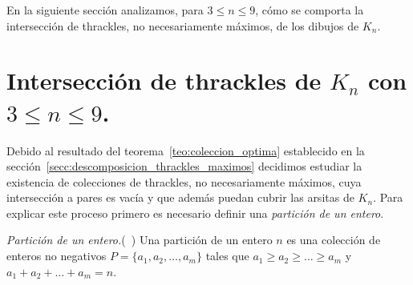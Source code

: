   En la siguiente sección analizamos, para $ 3\leq n\leq 9$, cómo
  se comporta la intersección de thrackles, no necesariamente máximos, de los
  dibujos de $K_n$.


  \section{Intersección de thrackles de $K_n$ con $3\leq n \leq 9$.}\label{secc:interseccion_thrackles}

    Debido al resultado del teorema~\ref{teo:coleccion_optima} establecido
    en la sección~\ref{secc:descomposicion_thrackles_maximos} decidimos estudiar
    la existencia de colecciones de thrackles, no necesariamente máximos,
    cuya intersección a pares es vacía y que además puedan cubrir las arsitas
    de $K_n$. Para explicar este proceso primero es necesario definir una
    \emph{partición de un entero}.

    \begin{definition}{\emph{Partición de un entero.}(~\cite{Knuth2011})}
      Una partición de un entero $n$ es una colección de enteros
      no negativos $P = \{a_1, a_2, \dots, a_m\}$ tales que
      $a_1 \geq a_2\geq \dots \geq a_m$ y $a_1 + a_2 + \dots + a_m = n$.
    \end{definition}

